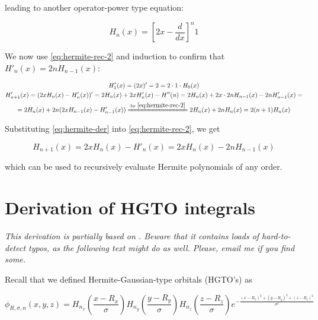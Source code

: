\documentclass{article}
\newcommand{\equalby}[1]{\xlongequal{\text{by }\eqref{#1}}}
\begin{document}
\begin{appendices}
leading to another operator-power type equation:

\begin{equation}
H_n(x) = \left[2x - \frac{d}{dx}\right]^n 1
\end{equation}

We now use \eqref{eq:hermite-rec-2} and induction to confirm that \begin{math}H'_n(x) = 2nH_{n-1}(x)\end{math}:

\begin{equation} \label{eq:hermite-der}
\begin{gathered}
H'_1(x) = (2x)' = 2 = 2\cdot 1\cdot H_0(x) \\
H'_{n+1}(x) = (2xH_n(x) - H'_n(x))' = 2H_n(x) + 2xH'_n(x) - H''(n) = 2H_n(x) + 2x\cdot 2nH_{n-1}(x) - 2nH'_{n-1}(x) = \\
= 2H_n(x) + 2n(2xH_{n-1}(x) - H'_{n-1}(x)) \equalby{eq:hermite-rec-2} 2H_n(x) + 2nH_n(x) = 2(n+1)H_n(x)
\end{gathered}
\end{equation}

Substituting \eqref{eq:hermite-der} into \eqref{eq:hermite-rec-2}, we get

\begin{equation} \label{eq:hermite-rec}
H_{n+1}(x) = 2xH_n(x) - H'_n(x) = 2xH_n(x) - 2nH_{n-1}(x)
\end{equation}

which can be used to recursively evaluate Hermite polynomials of any order.

\newpage

\section{Derivation of HGTO integrals} \label{apx:integrals}

\textit{This derivation is partially based on \cite{ref:gto}. Beware that it contains loads of hard-to-detect typos, as the following text might do as well. Please, email me if you find some.}

Recall that we defined Hermite-Gaussian-type orbitals (HGTO's) as

\begin{equation}
\phi_{R,\sigma,n}(x,y,z) = H_{n_x}\left(\frac{x-R_x}{\sigma}\right)H_{n_y}\left(\frac{y-R_y}{\sigma}\right)H_{n_z}\left(\frac{z-R_z}{\sigma}\right) e^{-\frac{(x-R_x)^2+(y-R_y)^2+(z-R_z)^2}{\sigma^2}}
\end{equation}


\end{appendices}
\end{document}
